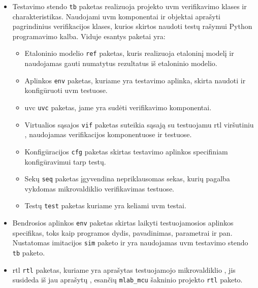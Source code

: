 \begin{itemize}
	\item Testavimo stendo \texttt{tb} paketas realizuoja projekto \gls{uvm} verifikavimo klases ir charakteristikas. Naudojami \gls{uvm} komponentai ir objektai aprašyti pagrindinius verifikacijos klases, kurios skirtos naudoti testų rašymui Python programavimo kalba. Viduje esantys paketai yra:

	      \begin{itemize}
		      \item Etaloninio modelio \texttt{ref}  paketas, kuris realizuoja  etaloninį modelį ir naudojamas gauti numatytus  rezultatus iš etaloninio modelio.
		      \item Aplinkos \texttt{env}  paketas, kuriame yra  testavimo aplinka, skirta naudoti ir konfigūruoti \gls{uvm} testuose.
		      \item \gls{uvc} \texttt{uvc} paketas, jame yra sudėti   verifikavimo komponentai.
		      \item Virtualios sąsajos \texttt{vif}  paketas suteikia sąsają su testuojamu  \gls{rtl} viršutiniu  , naudojamas verifikacijos komponentuose ir testuose.
		      \item Konfigūracijos \texttt{cfg}  paketas skirtas testavimo aplinkos specifiniam konfigūravimui tarp testų.
		      \item Sekų \texttt{seq}  paketas įgyvendina nepriklausomas sekas, kurių pagalba vykdomas mikrovaldiklio verifikavimas testuose.
		      \item Testų \texttt{test} paketas kuriame yra keliami \gls{uvm} testai.
	      \end{itemize}

	\item Bendrosios aplinkos \texttt{env} paketas skirtas laikyti testuojamosios aplinkos specifikas, toks kaip programos dydis, pavadinimas, parametrai ir pan. Nustatomas imitacijos \texttt{sim} paketo ir yra naudojamas \gls{uvm} testavimo stendo \texttt{tb} paketo.

	\item \gls{rtl} \texttt{rtl} paketas, kuriame yra aprašytas testuojamojo mikrovaldiklio , jis susideda iš jau aprašytų , esančių \texttt{mlab\_mcu} šakninio projekto \texttt{rtl} paketo.


\end{itemize}

